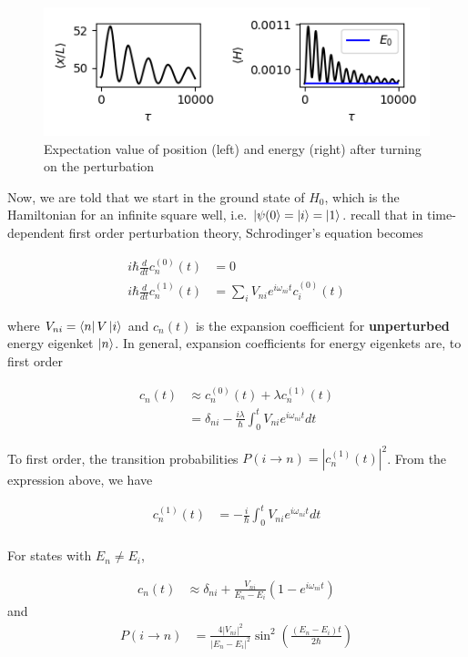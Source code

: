 \documentclass[12pt]{article}
\theoremstyle{definition}
\begin{document}
{\begin{figure}
\includegraphics[scale=1.5]{Figure_3.png}
\centering
\caption{Expectation value of position (left) and energy (right) after turning on the perturbation}
\end{figure}

Now, we are told that we start in the ground state of $H_{0}$, which is the Hamiltonian for an infinite square well, i.e. $\ket{\psi(0} = \ket{i} = \ket{1}$. recall that in time-dependent first order perturbation theory, Schrodinger's equation becomes

\begin{align*}
i\hbar\frac{d}{dt}c_{n}^{(0)}(t) &= 0\\
i\hbar\frac{d}{dt}c_{n}^{(1)}(t) &= \sum_{i}V_{ni}e^{i\omega_{ni}t}c_{i}^{(0)}(t)
\end{align*}

where $V_{ni} = \bra{n}V\ket{i}$ and $c_{n}(t)$ is the expansion coefficient for \textbf{unperturbed} energy eigenket $\ket{n}$. In general, expansion coefficients for energy eigenkets are, to first order

\begin{align*}
c_{n}(t) &\approx c_{n}^{(0)}(t) + \lambda c_{n}^{(1)}(t)\\
&= \delta_{ni} - \frac{i\lambda}{\hbar}\int_{0}^{t}V_{ni}e^{i\omega_{ni}t}dt
\end{align*}

To first order, the transition probabilities $P(i\rightarrow n) = |c_{n}^{(1)}(t)|^{2}$. From the expression above, we have

\begin{align*}
c_{n}^{(1)}(t) &= -\frac{i}{\hbar}\int_{0}^{t}V_{ni} e^{i\omega_{ni}t}dt\\
\end{align*}

For states with $E_{n}\neq E_{i}$, 

\begin{align*}
c_{n}(t) &\approx \delta_{ni} + \frac{V_{ni}}{E_{n}-E_{i}}(1-e^{i\omega_{ni}t})
\end{align*}
and
\begin{align}
P(i\rightarrow n) &= \frac{4|V_{ni}|^{2}}{|E_{n}-E_{i}|^{2}}\sin^{2}\left(\frac{(E_{n}-E_{i})t}{2\hbar}\right)
\end{align}

}
\end{document}
